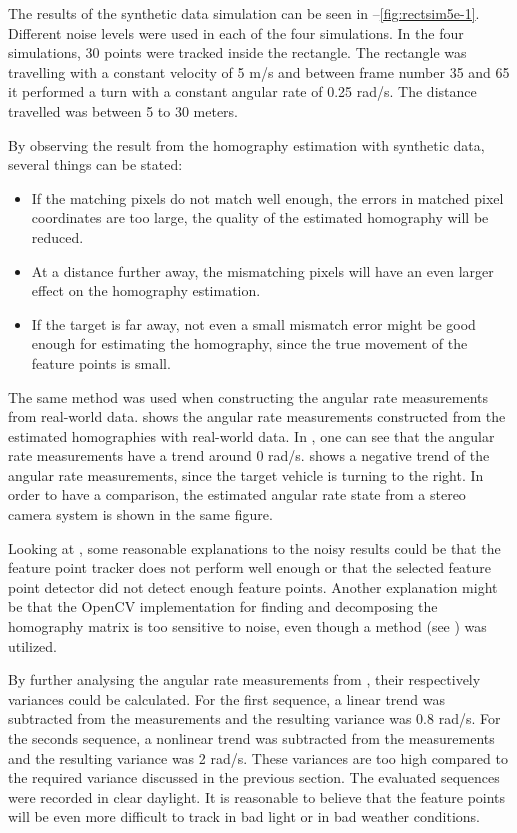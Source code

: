 The results of the synthetic data simulation can be seen in --\ref{fig:rectsim5e-1}.
Different noise levels were used in each of the four simulations.
In the four simulations, 30 points were tracked inside the rectangle.
The rectangle was travelling with a constant velocity of 5 m/s and between frame number 35 and 65 it performed a turn with a constant angular rate of 0.25 rad/s.
The distance travelled was between 5 to 30 meters.

By observing the result from the homography estimation with synthetic data, several things can be stated:
\begin{itemize}
	\item If the matching pixels do not match well enough, \ie the errors in matched pixel coordinates are too large, the quality of the estimated homography will be reduced.
	\item At a distance further away, the mismatching pixels will have an even larger effect on the homography estimation.
	\item If the target is far away, not even a small mismatch error might be good enough for estimating the homography, since the true movement of the feature points is small.
\end{itemize}

The same method was used when constructing the angular rate measurements from real-world data.
 shows the angular rate measurements constructed from the estimated homographies with real-world data.
In , one can see that the angular rate measurements have a trend around 0 rad/s.
 shows a negative trend of the angular rate measurements, since the target vehicle is turning to the right.
In order to have a comparison, the estimated angular rate state from a stereo camera system is shown in the same figure.

Looking at , some reasonable explanations to the noisy results could be that the feature point tracker does not perform well enough or that the selected feature point detector did not detect enough feature points.
Another explanation might be that the OpenCV implementation for finding and decomposing the homography matrix is too sensitive to noise, even though a \abbrRANSAC method (see ) was utilized.

By further analysing the angular rate measurements from , their respectively variances could be calculated.
For the first sequence, a linear trend was subtracted from the measurements and the resulting variance was 0.8 rad/s.
For the seconds sequence, a nonlinear trend was subtracted from the measurements and the resulting variance was 2 rad/s.
These variances are too high compared to the required variance discussed in the previous section.
The evaluated sequences were recorded in clear daylight.
It is reasonable to believe that the feature points will be even more difficult to track in bad light or in bad weather conditions.

